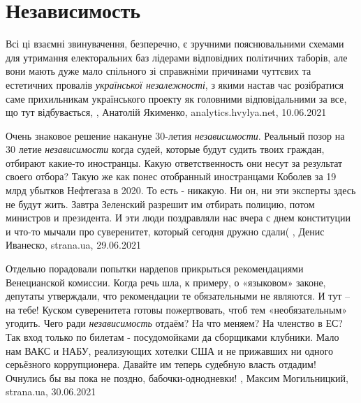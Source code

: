  
 
 
 
 
\chapter{Независимость}
\label{sec:slova.nezavisimost}

Всі ці взаємні звинувачення, безперечно, є зручними пояснювальними схемами для
утримання електоральних баз лідерами відповідних політичних таборів, але вони
мають дуже мало спільного зі справжніми причинами чуттєвих та естетичних
провалів \emph{української незалежності}, з якими настав час розібратися саме
прихильникам українського проекту як головними відповідальними за все, що тут
відбувається,
, Анатолій Якименко, analytics.hvylya.net, 10.06.2021

Очень знаковое решение накануне 30-летия \emph{независимости}.  Реальный позор на 30
летие \emph{независимости} когда судей, которые будут судить твоих граждан, отбирают
какие-то иностранцы. Какую ответственность они несут за результат своего
отбора? Такую же как понес отобранный иностранцами Коболев за 19 млрд убытков
Нефтегаза в 2020. То есть - никакую.  Ни он, ни эти эксперты здесь не будут
жить. Завтра Зеленский разрешит им отбирать полицию, потом министров и
президента. И эти люди поздравляли нас вчера с днем конституции и что-то мычали
про суверенитет, который сегодня дружно сдали(
, 
Денис Иванеско, strana.ua, 29.06.2021

Отдельно порадовали попытки нардепов прикрыться рекомендациями Венецианской
комиссии. Когда речь шла, к примеру, о «языковом» законе, депутаты утверждали,
что рекомендации те обязательными не являются. И тут – на тебе! Куском
суверенитета готовы пожертвовать, чтоб тем «необязательным» угодить.  Чего ради
\emph{независимость} отдаём? На что меняем? На членство в ЕС? Так вход только по
билетам - посудомойками да сборщиками клубники. Мало нам ВАКС и НАБУ,
реализующих хотелки США и не прижавших ни одного серьёзного коррупционера.
Давайте им теперь судебную власть отдадим! Очнулись бы вы пока не поздно,
бабочки-однодневки!
, 
Максим Могильницкий, strana.ua, 30.06.2021

